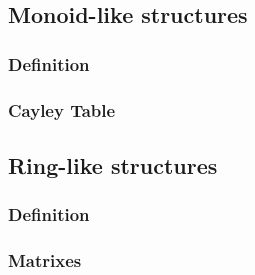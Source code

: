\subsection{Monoid-like structures}
\subsubsection{Definition}
\subsubsection{Cayley Table}
\subsection{Ring-like structures}
\subsubsection{Definition}
\subsubsection{Matrixes}

